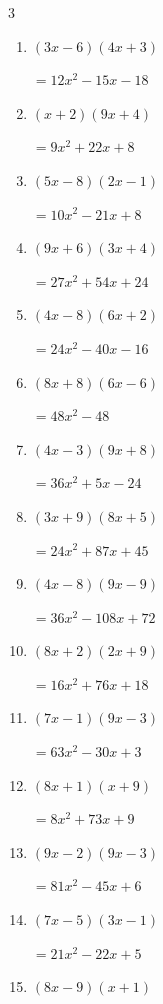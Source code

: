 \begin{multicols}{3}
\begin{enumerate}
        $=10x^{2}+49x+49$

\columnbreak %

\resetques

  \item $(3x-6)(4x+3)$

        $=12x^{2}-15x-18$

  \item $(x+2)(9x+4)$

        $=9x^{2}+22x+8$

  \item $(5x-8)(2x-1)$

        $=10x^{2}-21x+8$

  \item $(9x+6)(3x+4)$

        $=27x^{2}+54x+24$

  \item $(4x-8)(6x+2)$

        $=24x^{2}-40x-16$

  \item $(8x+8)(6x-6)$

        $=48x^{2}-48$

  \item $(4x-3)(9x+8)$

        $=36x^{2}+5x-24$

  \item $(3x+9)(8x+5)$

        $=24x^{2}+87x+45$

  \item $(4x-8)(9x-9)$

        $=36x^{2}-108x+72$

  \item $(8x+2)(2x+9)$

        $=16x^{2}+76x+18$

  \item $(7x-1)(9x-3)$

        $=63x^{2}-30x+3$

  \item $(8x+1)(x+9)$

        $=8x^{2}+73x+9$

  \item $(9x-2)(9x-3)$

        $=81x^{2}-45x+6$

  \item $(7x-5)(3x-1)$

        $=21x^{2}-22x+5$

  \item $(8x-9)(x+1)$


\end{enumerate}
\end{multicols}

